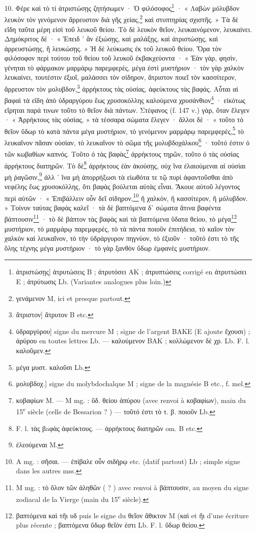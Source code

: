 \documentclass[a4paper, 11pt, oneside, polutonikogreek, french]{article}
\begin{document}
10. Φέρε καὶ τὸ τί ἀτριστώσῃς ζητήσωμεν · Ὁ φιλόσοφος\footnote{ἀτριστώσῃς] ἀτρυτώσεις B ; ἀτρυτόσει AK ; ἀτρυπτώσεις corrigé en ἀτρυττώσει E ; ἀτρύτωσις Lb. (Variantes analogues plus loin.)} · « Λαβὼν μόλυβδον λευκὸν τὸν γενόμενον ἄρρευστον διὰ γῆς χείας,\footnote{γενάμενον M, ici et presque partout.} καὶ στυπτηρίας σχιστῆς. » Τὰ δὲ εἴδη ταῦτα μέρη εἰσὶ τοῦ λευκοῦ θείου. Τὸ δὲ λευκὸν θεῖον, λευκαινόμενον, λευκαίνει. Δημόκριτος δέ · « Ἐπειδ ᾽ ἂν ἐξιώσῃς, καὶ μαλάξῃς, καὶ ἀτριστώσῃς, καὶ ἀρρευστώσῃς, ἢ λευκώσῃς. » Ἡ δὲ λεύκωσις ἐκ τοῦ λευκοῦ θείου. Ὅρα τὸν φιλόσοφον περὶ τούτου τοῦ θείου τοῦ λευκοῦ ἐκβακχεύοντα · « Ἐὰν γὰρ, φησὶν, γένηται τὸ φάρμακον μαρμάρῳ παρεμφερὲς, μέγα ἐστὶ μυστήριον · τὸν γὰρ χαλκὸν λευκαίνει, τουτέστιν ἐξιοῖ, μαλάσσει τὸν σίδηρον, ἄτριστον ποιεῖ τὸν κασσίτερον, ἄρρευστον τὸν μολυβδον,\footnote{ἄτριστον] ἄτρυτον B etc.} ἀρρήκτους τὰς οὐσίας, ἀφεύκτους τὰς βαφάς. Αὗται αἱ βαφαὶ τὰ εἴδη ἀπὸ ὑδραργύρου ἕως χρυσοκόλλης καλούμενα χρυσάνθιον\footnote{ὑδραργύρου] signe du mercure M ; signe de l'argent BAKE (E ajoute ἔχουσι) ; ἀρύρου en toutes lettres Lb. --- καλούμενον BAΚ ; κολλώμενον δὲ χρ. Lb. F. l. καλοῦμεν.} · εἰκότως εἴρηται παρά τινων τοῦτο τὸ θεῖον διὰ πάντων. Στέφανος (f. 147 v.) γὰρ, ὅταν ἔλεγεν · « Ἀρρήκτους τὰς οὐσίας, » τὰ τέσσαρα σώματα ἔλεγεν · ἄλλοι δὲ · « τοῦτο τὸ θεῖον ὕδωρ τὸ κατὰ πάντα μέγα μυστήριον, τὸ γενόμενον μαρμάρῳ παρεμφερὲς,\footnote{μέγα μυστ. καλοῦσι Lb.} τὸ λευκαῖνον πᾶσαν οὐσίαν, τὸ λευκαῖνον τὸ σῶμα τῆς μολυβδοχάλκου\footnote{μολυβδοχ.] signe du molybdochalque M ; signe de la magnésie B etc., f. mel.} · τοῦτό ἐστιν ὁ τῶν κωβαθίων καπνός. Τοῦτο ὁ τὰς βαφὰς\footnote{κοβαφίων M. --- M mg. : ὕδ. θείου ἀπύρου (avec renvoi à κοβαφίων), main du 15\textsuperscript{e} siècle (celle de Bessarion ? ) --- τοῦτό ἐστι τὸ τ. β. ποιοῦν Lb.} ἀρρήκτους τηρῶν, τοῦτο ὁ τὰς οὐσίας ἀρρήκτους διατηρῶν. Τὸ δὲ\footnote{F. l. τὰς βaφὰς ἀφεύκτους. --- ἀρρήκτους διατηρῶν om. B etc.} ἀρρήκτους ἐὰν ἀκούσῃς, οὐχ ἵνα ἐλαιούμεναι αἱ οὐσίαι μὴ ῥαγῶσιν,\footnote{ἐλεούμεναι M.} ἀλλ ᾽ ἵνα μὴ ἀπορρήξωσι τὰ εἰωθότα τε τῷ πυρὶ ἀφαντοῦσθαι ἀπὸ νεφέλης ἕως χρυσοκόλλης, ὅτι βαφὰς βούλεται αὐτὰς εἶναι. Ἄκουε αὐτοῦ λέγοντος περὶ αὐτῶν · « Ἐπιβάλλειν οὖν δεῖ σίδηρον,\footnote{A mg. : σῆσαι. --- ἐπίβαλε οὗν σιδήρῳ etc. (datif partout) Lb ; simple signe dans les autres mss.} ἢ χαλκὸν, ἢ κασσίτερον, ἢ μόλυβδον. » Τοίνυν ταύτας βαφὰς καλεῖ · τὰ δὲ βαπτόμενα δʹ σώματα ἅτινα βαφέντα βάπτουσιν\footnote{M mg. : τὸ ὅλον τῶν ἀληθῶν ( ? ) avec renvoi à βάπτουσιν, au moyen du signe zodiacal de la Vierge \virgo (main du 15\textsuperscript{e} siècle).} · τὸ δὲ βάπτον τὰς βαφὰς καὶ τὰ βαπτόμενα ὕδατα θείου, τὸ μέγα\footnote{βαπτόμενα καὶ τῆι υδ puis le signe du θεῖον ἄθικτον M (καὶ et ῆι d'une écriture plus récente ; βαπτόμενα ὕδωρ θεῖόν ἐστι Lb. F. l. ὕδωρ θείου.} μυστήριον, τὸ μαρμάρῳ παρεμφερὲς, τὸ τὰ πάντα ποιοῦν ἐπιτήδεια, τὸ καῖον τὸν χαλκὸν καὶ λευκαῖνον, τὸ τὴν ὑδράργυρον πηγνύον, τὸ ἐξιοῦν · τοῦτό ἐστι τὸ τῆς ὅλης τέχνης μέγα μυστήριον · τὸ γὰρ ξανθὸν ὕδωρ ἐμφανὲς μυστήριον.
\end{document}
